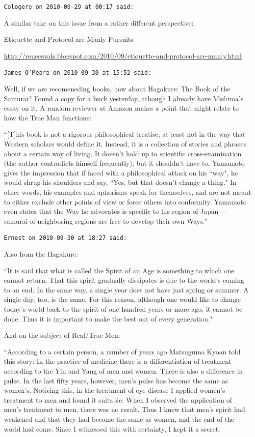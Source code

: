 \begin{footnotesize}
\begin{sffamily}
\hfill

\texttt{Cologero on 2010-09-29 at 00:17 said: }

A similar take on this issue from a rather different perspective:

Etiquette and Protocol are Manly Pursuits

\url{http://rencesvals.blogspot.com/2010/09/etiquette-and-protocol-are-manly.html}


\hfill

\texttt{James O'Meara on 2010-09-30 at 15:52 said: }

Well, if we are recomeneding books, how about Hagakure: The Book of the Samurai? Found a copy for a buck yesterday, athough I already have Mishima's essay on it. A random reviewer at Amazon makes a point that might relate to how the True Man functions:

``[T]his book is not a rigorous philosophical treatise, at least not in the way that Western scholars would define it. Instead, it is a collection of stories and phrases about a certain way of living. It doesn't hold up to scientific cross-examination (the author contradicts himself frequently), but it shouldn't have to. Yamamoto gives the impression that if faced with a philosophical attack on his ``way", he would shrug his shoulders and say, ``Yes, but that doesn't change a thing." In other words, his examples and aphorisms speak for themselves, and are not meant to either exclude other points of view or force others into conformity. Yamamoto even states that the Way he advocates is specific to his region of Japan — samurai of neighboring regions are free to develop their own Ways."


\hfill

\texttt{Ernest on 2010-09-30 at 18:27 said: }

Also from the Hagakure:

``It is said that what is called the Spirit of an Age is something to which one cannot return. That this spirit gradually dissipates is due to the world's coming to an end.
In the same way, a single year does not have just spring or summer. A single day, too, is the same. For this reason, although one would like to change today's world back to the spirit of one hundred years or more ago, it cannot be done. Thus it is important to make the best out of every generation."

And on the subject of Real/True Men:

``According to a certain person, a number of years ago Matsuguma Kyoan told this story: In the practice of medicine there is a differentiation of treatment according to the Yin and Yang of men and women. There is also a difference in pulse. In the last fifty years, however, men's pulse has become the same as women's. Noticing this, in the treatment of eye disease I applied women's treatment to men and found it suitable. When I observed the application of men's treatment to men, there was no result. Thus I knew that men's spirit had weakened and that they had become the same as women, and the end of the world had come. Since I witnessed this with certainty, I kept it a secret.


\end{sffamily}
\end{footnotesize}

